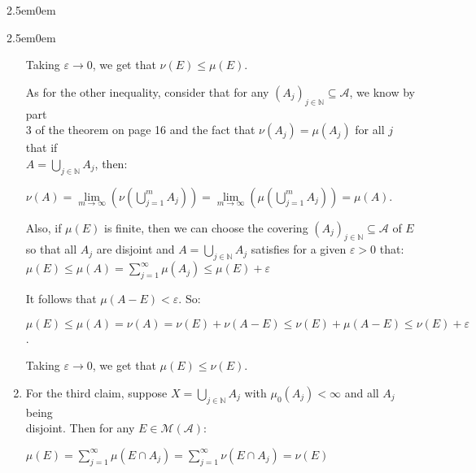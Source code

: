 \documentclass{book}
\newcommand{\exOne}{%
   \color{Purple}%
   \fontsize{13}{15}\selectfont%
}
\newenvironment{myIndent}{%
   \begin{adjustwidth}{2.5em}{0em}%
}{%
   \end{adjustwidth}%
}
\newcommand{\mySepTwo}[1][.]{%
   {\noindent\color{#1}{\rule{6.5in}{0.5mm}}}\\%
}
\newcommand{\retTwo}{\hfill\bigbreak}
\begin{document}
\begin{myIndent}
\begin{myIndent}
\begin{enumerate}
         Taking $\varepsilon \rightarrow 0$, we get that $\nu(E) \leq \mu(E)$.\newpage
   
         As for the other inequality, consider that for any $(A_j)_{j \in \mathbb{N}} \subseteq \mathcal{A}$, we know by part\\ 3 of the theorem on page 16 and the fact that $\nu(A_j) = \mu(A_j)$ for all $j$ that if\\ $A = \bigcup\limits_{j\in\mathbb{N}}A_j$, then:\\ [-17pt]
         
         {\centering $ \nu(A) = \lim\limits_{m\rightarrow \infty}(\nu(\bigcup\limits_{j=1}^m A_j)) = \lim\limits_{m\rightarrow \infty}(\mu(\bigcup\limits_{j=1}^m A_j)) = \mu(A)$. \retTwo\par}
   
         Also, if $\mu(E)$ is finite, then we can choose the covering $(A_j)_{j \in \mathbb{N}} \subseteq \mathcal{A}$ of $E$ so that all $A_j$ are disjoint and $A = \bigcup\limits_{j \in \mathbb{N}}A_j$ satisfies for a given $\varepsilon > 0$ that:\\ [-9pt]\phantom{Aaaaaaaaaaaaaaaaaaaaaaaaaaaaaaaa}$\mu(E) \leq \mu(A) = \sum\limits_{j = 1}^\infty \mu(A_j) \leq \mu(E) + \varepsilon$\retTwo
   
         It follows that $\mu(A - E) < \varepsilon$. So:
         
         {\centering $\mu(E) \leq \mu(A) = \nu(A) = \nu(E) + \nu(A - E) \leq \nu(E) + \mu(A - E) \leq \nu(E) + \varepsilon$.\retTwo\par}
   
         Taking $\varepsilon \rightarrow 0$, we get that $\mu(E) \leq \nu(E)$.\retTwo

         \item For the third claim, suppose $X = \bigcup\limits_{j \in \mathbb{N}}A_j$ with $\mu_0(A_j) < \infty$ and all $A_j$ being\\ disjoint. Then for any $E \in \mathcal{M}(\mathcal{A})$:
         
         {\centering $\mu(E) = \sum\limits_{j=1}^\infty \mu(E \cap A_j) = \sum\limits_{j=1}^\infty \nu(E \cap A_j) = \nu(E) $ \retTwo\par}
      \end{enumerate}
   \end{myIndent}
\end{myIndent}

\exOne

\mySepTwo
\end{document}
